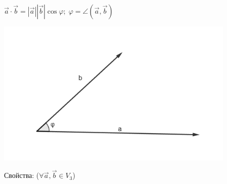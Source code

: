 \documentclass[twoside]{book}
\begin{document}
\(\vec a \cdot \vec b = |\vec a| |\vec b| \cos\varphi;\; \varphi = \angle(\vec a, \vec b)\)
\begin{center}
    \includegraphics[height=7cm]{Images/Chapter_1/1-4-1.png}
\end{center}
Свойства: (\(\forall \vec a, \vec b \in V_3\))
\end{document}
